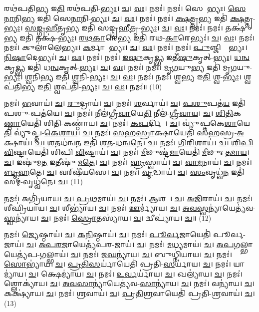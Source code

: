 𑌰𑌥॑𑌪𑌤𑌿\ul{𑌭𑍍𑌯} 𑌇\ul{𑌤𑌿} 𑌰𑌥॑𑌪𑌤𑌿-\ul{𑌭𑍍𑌯𑌃}। \ul{𑌚}। \ul{𑌵𑌃}। 𑌨𑌮𑌃॑। 
𑌨𑌮𑌃॑। 𑌸𑍇𑌨𑌾᳚𑌭𑍍𑌯𑌃। \ul{𑌸𑍇}\ul{𑌨𑌾}𑌨𑌿\ul{𑌭𑍍𑌯} 𑌇𑌤𑌿॑ 𑌸𑍇\ul{𑌨𑌾}𑌨𑌿-\ul{𑌭𑍍𑌯𑌃}। \ul{𑌚}। \ul{𑌵𑌃}। 𑌨𑌮𑌃॑। 
𑌨𑌮𑌃॑। \ul{𑌕𑍍𑌷}𑌤𑍍𑌤𑍃\ul{𑌭𑍍𑌯} 𑌇𑌤𑌿॑ \ul{𑌕𑍍𑌷}𑌤𑍍𑌤𑍃-\ul{𑌭𑍍𑌯𑌃}। \ul{𑌸}\ul{𑌙𑍍𑌗𑍍𑌰}\ul{𑌹𑍀}𑌤𑍃\ul{𑌭𑍍𑌯} 𑌇𑌤𑌿॑ 𑌸𑌙𑍍𑌗𑍍𑌰\ul{𑌹𑍀}𑌤𑍃-\ul{𑌭𑍍𑌯𑌃}। \ul{𑌚}। \ul{𑌵𑌃}। 𑌨𑌮𑌃॑। 
𑌨𑌮𑌃॑। 𑌤𑌕𑍍𑌷॑\ul{𑌭𑍍𑌯} 𑌇𑌤𑌿॑ 𑌤𑌕𑍍𑌷॑-\ul{𑌭𑍍𑌯𑌃}। \ul{𑌰}\ul{𑌥}\ul{𑌕𑌾}𑌰𑍇\ul{𑌭𑍍𑌯} 𑌇𑌤𑌿॑ 𑌰𑌥-\ul{𑌕𑌾}𑌰𑍇𑌭𑍍𑌯𑌃॑। \ul{𑌚}। \ul{𑌵𑌃}। 𑌨𑌮𑌃॑। 
𑌨𑌮𑌃॑। 𑌕𑍁𑌲𑌾॑𑌲𑍇𑌭𑍍𑌯𑌃। \ul{𑌕}𑌰𑍍𑌮𑌾𑌰𑍇᳚𑌭𑍍𑌯𑌃। \ul{𑌚}। \ul{𑌵𑌃}। 𑌨𑌮𑌃॑। 
𑌨𑌮𑌃॑। \ul{𑌪𑍁}𑌞𑍍𑌜𑌿𑌷𑍍𑌟𑍇᳚𑌭𑍍𑌯𑌃। \ul{𑌨𑌿}\ul{𑌷𑌾}𑌦𑍇𑌭𑍍𑌯𑌃॑। \ul{𑌚}। \ul{𑌵𑌃}। 𑌨𑌮𑌃॑। 
𑌨𑌮𑌃॑। \ul{𑌇}\ul{𑌷𑍁}𑌕𑍃\ul{𑌦𑍍𑌭𑍍𑌯} 𑌇𑌤𑍀॑\ul{𑌷𑍁}𑌕𑍃𑌤𑍍-\ul{𑌭𑍍𑌯𑌃}। \ul{𑌧}\ul{𑌨𑍍𑌵}𑌕𑍃\ul{𑌦𑍍𑌭𑍍𑌯} 𑌇𑌤𑌿॑ 𑌧\ul{𑌨𑍍𑌵}𑌕𑍃𑌤𑍍-\ul{𑌭𑍍𑌯𑌃}। \ul{𑌚}। \ul{𑌵𑌃}। 𑌨𑌮𑌃॑। 
𑌨𑌮𑌃॑। \ul{𑌮𑍃}\ul{𑌗}𑌯𑍁\ul{𑌭𑍍𑌯} 𑌇𑌤𑌿॑ 𑌮𑍃\ul{𑌗}𑌯𑍁-\ul{𑌭𑍍𑌯𑌃}। \ul{𑌶𑍍𑌵}𑌨𑌿\ul{𑌭𑍍𑌯} 𑌇𑌤𑌿॑ \ul{𑌶𑍍𑌵}𑌨𑌿-\ul{𑌭𑍍𑌯𑌃}। \ul{𑌚}। \ul{𑌵𑌃}। 𑌨𑌮𑌃॑। 
𑌨𑌮𑌃॑। 𑌶𑍍𑌵\ul{𑌭𑍍𑌯} 𑌇\ul{𑌤𑌿} 𑌶𑍍𑌵-\ul{𑌭𑍍𑌯𑌃}। 𑌶𑍍𑌵𑌪॑𑌤𑌿\ul{𑌭𑍍𑌯} 𑌇\ul{𑌤𑌿} 𑌶𑍍𑌵𑌪॑𑌤𑌿-\ul{𑌭𑍍𑌯𑌃}। \ul{𑌚}। \ul{𑌵𑌃}। 𑌨𑌮𑌃॑॥ (10)


𑌨𑌮𑌃॑। \ul{𑌭}𑌵𑌾𑌯॑। \ul{𑌚}। \ul{𑌰𑍁}𑌦𑍍𑌰𑌾𑌯॑। \ul{𑌚}। 
𑌨𑌮𑌃॑। \ul{𑌶}𑌰𑍍𑌵𑌾𑌯॑। \ul{𑌚}। \ul{𑌪}\ul{𑌶𑍁}𑌪𑌤॑\ul{𑌯} 𑌇𑌤𑌿॑ 𑌪𑌶𑍁-𑌪𑌤॑𑌯𑍇। \ul{𑌚}। 
𑌨𑌮𑌃॑। 𑌨𑍀𑌲॑𑌗𑍍𑌰𑍀\ul{𑌵𑌾}𑌯𑍇\ul{𑌤𑌿} 𑌨𑍀𑌲॑-\ul{𑌗𑍍𑌰𑍀}\ul{𑌵𑌾}\ul{𑌯}। \ul{𑌚}। \ul{𑌶𑌿}\ul{𑌤𑌿}𑌕\ul{𑌣𑍍𑌠𑌾}𑌯𑍇𑌤𑌿॑ 𑌶𑌿𑌤𑌿-𑌕𑌣𑍍𑌠𑌾॑𑌯। \ul{𑌚}। 
𑌨𑌮𑌃॑। \ul{𑌕}\ul{𑌪}𑌰𑍍𑌦𑌿𑌨𑍇᳚। \ul{𑌚}। 𑌵𑍍𑌯𑍁॑𑌪𑍍𑌤𑌕𑍇\ul{𑌶𑌾}𑌯𑍇\ul{𑌤𑌿} 𑌵𑍍𑌯𑍁॑𑌪𑍍𑌤-\ul{𑌕𑍇}\ul{𑌶𑌾}\ul{𑌯}। \ul{𑌚}। 
𑌨𑌮𑌃॑। \ul{𑌸}\ul{𑌹}\ul{𑌸𑍍𑌰𑌾}𑌕𑍍𑌷𑌾𑌯𑍇𑌤𑌿॑ 𑌸𑌹𑌸𑍍𑌰-\ul{𑌅}𑌕𑍍𑌷𑌾𑌯॑। \ul{𑌚}। \ul{𑌶}\ul{𑌤}𑌧॑𑌨𑍍𑌵\ul{𑌨} 𑌇𑌤𑌿॑ \ul{𑌶}𑌤-\ul{𑌧}\ul{𑌨𑍍𑌵}\ul{𑌨𑍇}। \ul{𑌚}। 
𑌨𑌮𑌃॑। \ul{𑌗𑌿}\ul{𑌰𑌿}𑌶𑌾𑌯॑। \ul{𑌚}। \ul{𑌶𑌿}\ul{𑌪𑌿}\ul{𑌵𑌿}𑌷𑍍𑌟𑌾𑌯𑍇𑌤𑌿॑ 𑌶𑌿𑌪𑌿-\ul{𑌵𑌿}𑌷𑍍𑌟𑌾𑌯॑। \ul{𑌚}। 
𑌨𑌮𑌃॑। \ul{𑌮𑍀}𑌢𑍁𑌷𑍍𑌟॑\ul{𑌮𑌾}𑌯𑍇𑌤𑌿॑ \ul{𑌮𑍀}𑌢𑍁𑌃-\ul{𑌤}\ul{𑌮𑌾}\ul{𑌯}। \ul{𑌚}। 𑌇𑌷𑍁॑𑌮\ul{𑌤} 𑌇𑌤𑍀𑌷𑍁॑-\ul{𑌮}\ul{𑌤𑍇}। \ul{𑌚}। 
𑌨𑌮𑌃॑। \ul{𑌹𑍍𑌰}𑌸𑍍𑌵𑌾𑌯॑। \ul{𑌚}। \ul{𑌵𑌾}\ul{𑌮}𑌨𑌾𑌯॑। \ul{𑌚}। 
𑌨𑌮𑌃॑। \ul{𑌬𑍃}\ul{𑌹}𑌤𑍇। \ul{𑌚}। 𑌵𑌰𑍍‌𑌷𑍀॑𑌯𑌸𑍇। \ul{𑌚}। 
𑌨𑌮𑌃॑। \ul{𑌵𑍃}𑌦𑍍𑌧𑌾𑌯॑। \ul{𑌚}। \ul{𑌸𑌂}𑌵𑍃𑌧𑍍𑌵॑\ul{𑌨} 𑌇𑌤𑌿॑ 𑌸𑌮𑍍-𑌵𑍃𑌧𑍍𑌵॑𑌨𑍇। \ul{𑌚}। (11)


𑌨𑌮𑌃॑। 𑌅𑌗𑍍𑌰𑌿॑𑌯𑌾𑌯। \ul{𑌚}। \ul{𑌪𑍍𑌰}\ul{𑌥}𑌮𑌾𑌯॑। \ul{𑌚}। 
𑌨𑌮𑌃॑। \ul{𑌆}𑌶𑌵𑍇᳚। \ul{𑌚}। \ul{𑌅}\ul{𑌜𑌿}𑌰𑌾𑌯॑। \ul{𑌚}। 
𑌨𑌮𑌃॑। 𑌶𑍀𑌘𑍍𑌰𑌿॑𑌯𑌾𑌯। \ul{𑌚}। 𑌶𑍀𑌭𑍍𑌯𑌾॑𑌯। \ul{𑌚}। 
𑌨𑌮𑌃॑। \ul{𑌊}𑌰𑍍𑌮𑍍𑌯𑌾॑𑌯। \ul{𑌚}। \ul{𑌅}\ul{𑌵}\ul{𑌸𑍍𑌵}𑌨𑍍𑌯𑌾॑𑌯𑍇𑌤𑍍𑌯॑𑌵-\ul{𑌸𑍍𑌵}𑌨𑍍𑌯𑌾॑𑌯। \ul{𑌚}। 
𑌨𑌮𑌃॑। \ul{𑌸𑍍𑌰𑍋}\ul{𑌤}𑌸𑍍𑌯𑌾॑𑌯। \ul{𑌚}। 𑌦𑍍𑌵𑍀𑌪𑍍𑌯𑌾॑𑌯। \ul{𑌚}॥ (12)


𑌨𑌮𑌃॑। \ul{𑌜𑍍𑌯𑍇}𑌷𑍍𑌠𑌾𑌯॑। \ul{𑌚}। \ul{𑌕}\ul{𑌨𑌿}𑌷𑍍𑌠𑌾𑌯॑। \ul{𑌚}। 
𑌨𑌮𑌃॑। \ul{𑌪𑍂}\ul{𑌰𑍍𑌵}𑌜𑌾𑌯𑍇𑌤𑌿॑ 𑌪𑍂𑌰𑍍𑌵-𑌜𑌾𑌯॑। \ul{𑌚}। \ul{𑌅}\ul{𑌪}\ul{𑌰}𑌜𑌾𑌯𑍇𑌤𑍍𑌯॑𑌪𑌰-𑌜𑌾𑌯॑। \ul{𑌚}। 
𑌨𑌮𑌃॑। \ul{𑌮}\ul{𑌧𑍍𑌯}𑌮𑌾𑌯॑। \ul{𑌚}। \ul{𑌅}\ul{𑌪}\ul{𑌗}𑌲𑍍𑌭𑌾𑌯𑍇𑌤𑍍𑌯॑𑌪-\ul{𑌗}𑌲𑍍𑌭𑌾𑌯॑। \ul{𑌚}। 
𑌨𑌮𑌃॑। \ul{𑌜}\ul{𑌘}𑌨𑍍𑌯𑌾॑𑌯। \ul{𑌚}। 𑌬𑍁𑌧𑍍𑌨𑌿॑𑌯𑌾𑌯। \ul{𑌚}। 
𑌨𑌮𑌃॑। \ul{𑌸𑍋}𑌭𑍍𑌯𑌾॑𑌯। \ul{𑌚}। \ul{𑌪𑍍𑌰}\ul{𑌤𑌿}\ul{𑌸}𑌰𑍍𑌯𑌾॑𑌯𑍇𑌤𑌿॑ 𑌪𑍍𑌰𑌤𑌿-\ul{𑌸}𑌰𑍍𑌯𑌾॑𑌯। \ul{𑌚}। 
𑌨𑌮𑌃॑। 𑌯𑌾𑌮𑍍𑌯𑌾॑𑌯। \ul{𑌚}। 𑌕𑍍𑌷𑍇𑌮𑍍𑌯𑌾॑𑌯। \ul{𑌚}। 
𑌨𑌮𑌃॑। \ul{𑌉}\ul{𑌰𑍍𑌵}𑌰𑍍𑌯𑌾॑𑌯। \ul{𑌚}। 𑌖𑌲𑍍𑌯𑌾॑𑌯। \ul{𑌚}। 
𑌨𑌮𑌃॑। 𑌶𑍍𑌲𑍋𑌕𑍍𑌯𑌾॑𑌯। \ul{𑌚}। \ul{𑌅}\ul{𑌵}\ul{𑌸𑌾}𑌨𑍍𑌯𑌾॑𑌯𑍇𑌤𑍍𑌯॑𑌵-\ul{𑌸𑌾}𑌨𑍍𑌯𑌾॑𑌯। \ul{𑌚}। 
𑌨𑌮𑌃॑। 𑌵𑌨𑍍𑌯𑌾॑𑌯। \ul{𑌚}। 𑌕𑌕𑍍𑌷𑍍𑌯𑌾॑𑌯। \ul{𑌚}। 
𑌨𑌮𑌃॑। \ul{𑌶𑍍𑌰}𑌵𑌾𑌯॑। \ul{𑌚}। \ul{𑌪𑍍𑌰}\ul{𑌤𑌿}\ul{𑌶𑍍𑌰}𑌵𑌾𑌯𑍇𑌤𑌿॑ 𑌪𑍍𑌰𑌤𑌿-\ul{𑌶𑍍𑌰}𑌵𑌾𑌯॑। \ul{𑌚}। (13)


